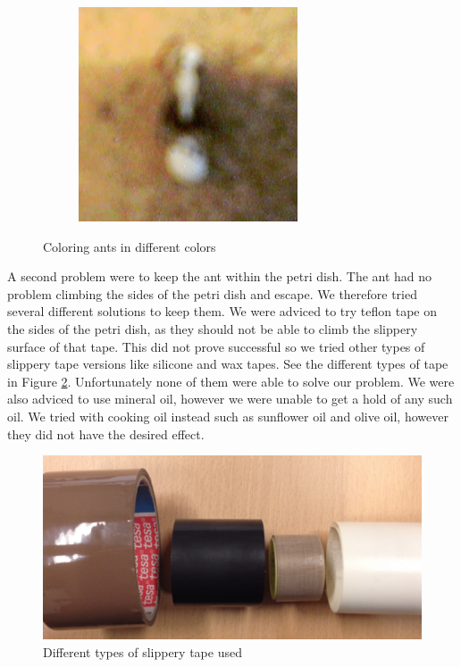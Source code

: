 \begin{figure}
\begin{subfigure}[b]{0.35\textwidth}
                \caption{}
        \end{subfigure}
		\quad
        \begin{subfigure}[b]{0.35\textwidth}
                \includegraphics[scale = 0.5]{img/white_ant}
                \caption{}
        \end{subfigure}
        \caption{Coloring ants in different colors}
		\label{fig:antcoloring}
\end{figure}

A second problem were to keep the ant within the petri dish. The ant had no problem climbing the sides of the petri dish and escape. We therefore tried several different solutions to keep them. We were adviced to try teflon tape on the sides of the petri dish, as they should not be able to climb the slippery surface of that tape. This did not prove successful so we tried other types of slippery tape versions like silicone and wax tapes. See the different types of tape in Figure \ref{fig:tape}. Unfortunately none of them were able to solve our problem. We were also adviced to use mineral oil, however we were unable to get a hold of any such oil. We tried with cooking oil instead such as sunflower oil and olive oil, however they did not have the desired effect.\\

\begin{figure}[ht!]
  \centering
    \includegraphics[scale=0.25]{img/tape}
  \caption{Different types of slippery tape used}
  \label{fig:tape}
\end{figure}

